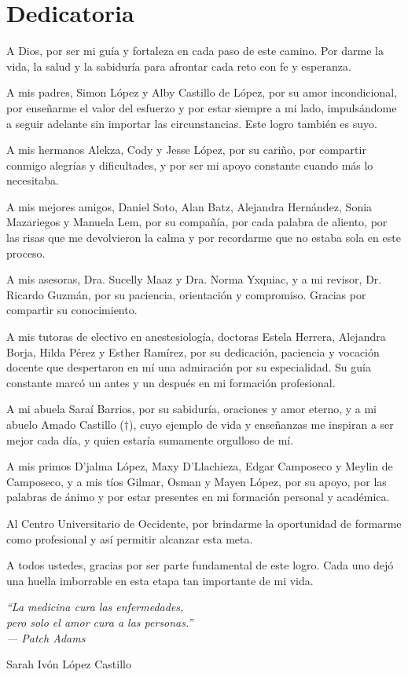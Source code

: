 \chapter*{Dedicatoria}

A Dios, por ser mi guía y fortaleza en cada paso de este camino. Por darme la 
vida, la salud y la sabiduría para afrontar cada reto con fe y esperanza.

A mis padres, Simon López y Alby Castillo de López, por su amor incondicional, 
por enseñarme el valor del esfuerzo y por estar siempre a mi lado, 
impulsándome a seguir adelante sin importar las circunstancias. Este logro 
también es suyo.

A mis hermanos Alekza, Cody y Jesse López, por su cariño, por compartir 
conmigo alegrías y dificultades, y por ser mi apoyo constante cuando más lo 
necesitaba.

A mis mejores amigos, Daniel Soto, Alan Batz, Alejandra Hernández, Sonia 
Mazariegos y Manuela Lem, por su compañía, por cada palabra de aliento, por 
las risas que me devolvieron la calma y por recordarme que no estaba sola en 
este proceso.

A mis asesoras, Dra. Sucelly Maaz y Dra. Norma Yxquiac, y a mi revisor, Dr. 
Ricardo Guzmán, por su paciencia, orientación y compromiso. Gracias por 
compartir su conocimiento.

A mis tutoras de electivo en anestesiología, doctoras Estela Herrera, 
Alejandra Borja, Hilda Pérez y Esther Ramírez, por su dedicación, paciencia y 
vocación docente que despertaron en mí una admiración por su especialidad. Su 
guía constante marcó un antes y un después en mi formación profesional.

A mi abuela Saraí Barrios, por su sabiduría, oraciones y amor eterno, y a mi 
abuelo Amado Castillo ($\dagger$), cuyo ejemplo de vida y enseñanzas me 
inspiran a ser mejor cada día, y quien estaría sumamente orgulloso de mí.

A mis primos D'jalma López, Maxy D'Llachieza, Edgar Camposeco y Meylin de 
Camposeco, y a mis tíos Gilmar, Osman y Mayen López, por su apoyo, por las 
palabras de ánimo y por estar presentes en mi formación personal y académica.

Al Centro Universitario de Occidente, por brindarme la oportunidad de 
formarme como profesional y así permitir alcanzar esta meta.

A todos ustedes, gracias por ser parte fundamental de este logro. Cada uno 
dejó una huella imborrable en esta etapa tan importante de mi vida.

\vspace{0.5cm}

\begin{center}
\textit{``La medicina cura las enfermedades, \\
pero solo el amor cura a las personas.''} \\
\textit{--- Patch Adams}
\end{center}

\begin{flushright}
Sarah Ivón López Castillo
\end{flushright}
